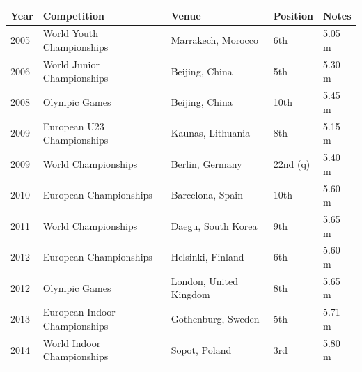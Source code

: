 \documentclass{article}
\begin{document}
\begin{tabular}{lllll}
\toprule
Year & Competition & Venue & Position & Notes \\
\midrule
2005 & World Youth Championships & Marrakech, Morocco & 6th & 5.05 m \\
2006 & World Junior Championships & Beijing, China & 5th & 5.30 m \\
2008 & Olympic Games & Beijing, China & 10th & 5.45 m \\
2009 & European U23 Championships & Kaunas, Lithuania & 8th & 5.15 m \\
2009 & World Championships & Berlin, Germany & 22nd (q) & 5.40 m \\
2010 & European Championships & Barcelona, Spain & 10th & 5.60 m \\
2011 & World Championships & Daegu, South Korea & 9th & 5.65 m \\
2012 & European Championships & Helsinki, Finland & 6th & 5.60 m \\
2012 & Olympic Games & London, United Kingdom & 8th & 5.65 m \\
2013 & European Indoor Championships & Gothenburg, Sweden & 5th & 5.71 m \\
2014 & World Indoor Championships & Sopot, Poland & 3rd & 5.80 m \\
\bottomrule
\end{tabular}
\end{document}
